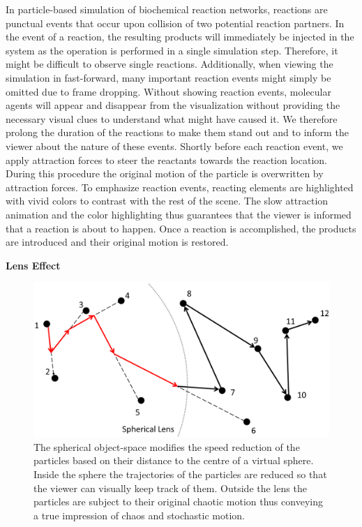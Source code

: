 In particle-based simulation of biochemical reaction networks, reactions are punctual events that occur upon collision of two potential reaction partners.
In the event of a reaction, the resulting products will immediately be injected in the system as the operation is performed in a single simulation step.
Therefore, it might be difficult to observe single reactions.
Additionally, when viewing the simulation in fast-forward, many important reaction events might simply be omitted due to frame dropping.
Without showing reaction events, molecular agents will appear and disappear from the visualization without providing the necessary visual clues to understand what might have caused it.
We therefore prolong the duration of the reactions to make them stand out and to inform the viewer about the nature of these events.
Shortly before each reaction event, we apply attraction forces to steer the reactants towards the reaction location. 
During this procedure the original motion of the particle is overwritten by attraction forces.
To emphasize reaction events, reacting elements are highlighted with vivid colors to contrast with the rest of the scene.
The slow attraction animation and the color highlighting thus guarantees that the viewer is informed that a reaction is about to happen.
Once a reaction is accomplished, the products are introduced and their original motion is restored.



\textbf{Lens Effect}

\begin{figure}
\centering
\includegraphics[width=0.5\linewidth]{graphics/SphericalLens}
\caption{The spherical object-space modifies the speed reduction of the particles based on their distance to the centre of a virtual sphere. Inside the sphere the trajectories of the particles are reduced so that the viewer can visually keep track of them. Outside the lens the particles are subject to their original chaotic motion thus conveying a true impression of chaos and stochastic motion.}
\label{fig:sphericallens}
\end{figure}

